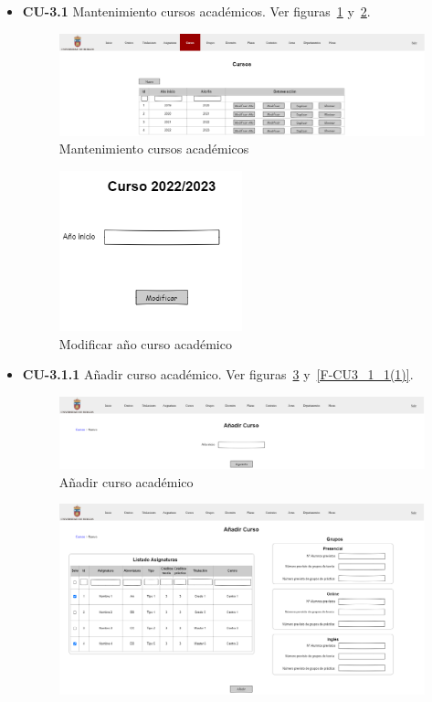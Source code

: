 \begin{itemize}
	\begin{itemize}
		\item \textbf{CU-3.1} Mantenimiento cursos académicos. Ver figuras~\ref{F-CU3_1} y~\ref{F-CU3_1(1)}.
		\begin{figure}[!h]
		\centering
		\includegraphics[width=\textwidth]{../img/Anexos/Vistas/cursos.png}
		\caption{Mantenimiento cursos académicos}\label{F-CU3_1}
		\end{figure}
		\FloatBarrier
		\begin{figure}[!h]
		\centering
		\includegraphics[width=0.5\textwidth]{../img/Anexos/Vistas/mod_ano_curso.png}
		\caption{Modificar año curso académico}\label{F-CU3_1(1)}
		\end{figure}
		\FloatBarrier
\newpage
		\item \textbf{CU-3.1.1} Añadir curso académico. Ver figuras~\ref{F-CU3_1_1} y~\ref{F-CU3_1_1(1)}.
		\begin{figure}[!h]
		\centering
		\includegraphics[width=\textwidth]{../img/Anexos/Vistas/add_curso.png}
		\caption{Añadir curso académico}\label{F-CU3_1_1}
		\end{figure}
		\FloatBarrier
		\begin{figure}[!h]
		\centering
		\includegraphics[width=\textwidth]{../img/Anexos/Vistas/add_curso_1.png}

\end{figure}
\end{itemize}
\end{itemize}
